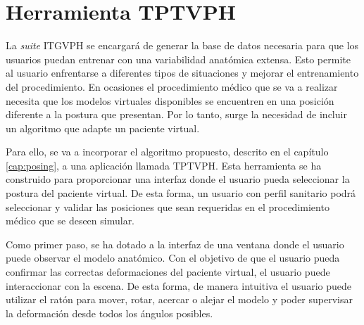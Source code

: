 \section{Herramienta TPTVPH}
\label{rasim:posing}

La \emph{suite} \ac{ITGVPH} se encargará de generar la base de datos necesaria para que los usuarios puedan entrenar con una variabilidad anatómica extensa. Esto permite al usuario enfrentarse a diferentes tipos de situaciones y mejorar el entrenamiento del procedimiento. En ocasiones el procedimiento médico que se va a realizar necesita que los modelos virtuales disponibles se encuentren en una posición diferente a la postura que presentan. Por lo tanto, surge la necesidad de incluir un algoritmo que adapte un paciente virtual.

%


Para ello,  se va a incorporar el algoritmo propuesto, descrito en el capítulo \ref{cap:posing}, a una aplicación llamada \ac{TPTVPH}. Esta herramienta se ha construido para proporcionar una interfaz donde el usuario pueda seleccionar la postura del paciente virtual. De esta forma, un usuario con perfil sanitario podrá seleccionar y validar las posiciones que sean requeridas en el procedimiento médico que se deseen simular.



Como primer paso, se ha dotado a la interfaz de una ventana donde el usuario puede observar el modelo anatómico. Con el objetivo de que el usuario pueda confirmar las correctas deformaciones del paciente virtual, el usuario puede interaccionar con la escena. De esta forma, de manera intuitiva el usuario puede utilizar el ratón para mover, rotar, acercar o alejar el modelo y poder supervisar la deformación desde todos los ángulos posibles.


